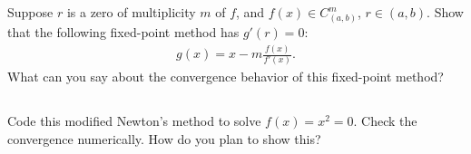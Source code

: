\documentclass[11pt,letterpaper]{report}
\begin{document}
\subsection{}
Suppose $r$ is a zero of multiplicity $m$ of $f$, and $f(x)\in C^m_{(a,b)}$, $r\in (a,b)$. Show that the following fixed-point method has $g'(r) = 0$:
\begin{align*}
    g(x) = x-m\frac{f(x)}{f'(x)}.
\end{align*}
What can you say about the convergence behavior of this fixed-point method?

\subsection{}
Code this modified Newton's method to solve $f(x) = x^2 = 0$. Check the convergence numerically. How do you plan to show this?





\end{document}
